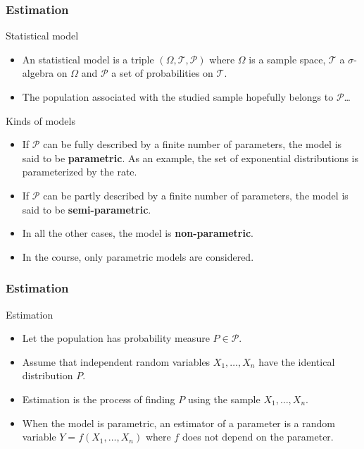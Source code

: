 \documentclass[main.tex]{subfiles}
\begin{document}
\begin{frame}
    \frametitle{Estimation}
\begin{block}{Statistical model}
   \begin{itemize}
    \item<+-> An statistical model is a triple $\left( \Omega, \mathcal{T}, \mathcal{P} \right)$ where $\Omega$ is a sample space,
    $\mathcal{T}$ a $\sigma$-algebra on $\Omega$ and $\mathcal{P}$ a set of probabilities on $\mathcal{T}.$
    \item<+-> The population associated with the studied sample hopefully belongs to $\mathcal{P}$\dots
   \end{itemize} 
\end{block}
\begin{block}{Kinds of models}
\begin{itemize}
    \item<+-> If $\mathcal{P}$ can be fully described by a finite number of parameters, the model is said to be \textbf{parametric}. As an example, 
    the set of exponential distributions is parameterized by the rate.
    \item<+-> If $\mathcal{P}$ can be partly described by a finite number of parameters, the model is said to be \textbf{semi-parametric}.
    \item<+-> In all the other cases, the model is \textbf{non-parametric}.
    \item<+-> In the course, only parametric models are considered. 
\end{itemize}    
\end{block}
 
\end{frame}
\begin{frame}
    \frametitle{Estimation}
\begin{block}{Estimation}
    \begin{itemize}
        \item<+-> Let the population has probability measure $P \in \mathcal{P}$.
        \item<+-> Assume that independent random variables $X_1,\dots, X_n$ have the identical distribution $P$.
        \item<+-> Estimation is the process of finding $P$ using the sample $X_1,\dots,X_n$.
        \item<+-> When the model is parametric, an estimator of a parameter is a 
        random variable $Y=f\left( X_1,\dots ,X_n \right)$ where $f$ does not depend on the parameter.
    \end{itemize}
 \end{block}
\end{frame}
\end{document}
